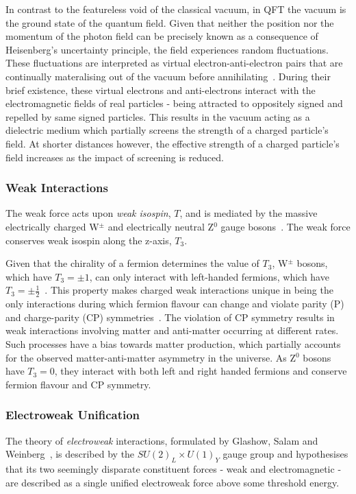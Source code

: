 In contrast to the featureless void of the classical vacuum, in QFT the vacuum is the ground state of the quantum field.
Given that neither the position nor the momentum of the photon field can be precisely known as a consequence of Heisenberg's uncertainty principle, the field experiences random fluctuations.
These fluctuations are interpreted as virtual electron-anti-electron pairs that are continually materalising out of the vacuum before annihilating~\cite{coughlan2006ideas}.
During their brief existence, these virtual electrons and anti-electrons interact with the electromagnetic fields of real particles - being attracted to oppositely signed and repelled by same signed particles.
This results in the vacuum acting as a dielectric medium which partially screens the strength of a charged particle's field.
At shorter distances however, the effective strength of a charged particle's field increases as the impact of screening is reduced.

\subsubsection{Weak Interactions}\label{subsec:weakForce}
The weak force acts upon \emph{weak isospin}, $T$, and is mediated by the massive electrically charged W$^{\pm}$ and electrically neutral Z$^{0}$ gauge bosons~\cite{ElectroweakStrong}.
The weak force conserves weak isospin along the z-axis, $T_{3}$.

Given that the chirality of a fermion determines the value of $T_{3}$, W$^{\pm}$ bosons, which have $T_{3} = \pm 1$, can only interact with left-handed fermions, which have $T_{3} = \pm \frac{1}{2}$~\cite{Cheng:1985bj}.
This property makes charged weak interactions unique in being the only interactions during which fermion flavour can change and violate parity (P)~\cite{Lee:1956qn,Wu:1957my} and charge-parity (CP) symmetries~\cite{Christenson:1964fg}.
The violation of CP symmetry results in weak interactions involving matter and anti-matter occurring at different rates.
Such processes have a bias towards matter production, which partially accounts for the observed matter-anti-matter asymmetry in the universe.
As Z$^{0}$ bosons have $T_{3} = 0$, they interact with both left and right handed fermions and conserve fermion flavour and CP symmetry.

\subsubsection{Electroweak Unification}\label{subsec:electroweak}
The theory of \emph{electroweak} interactions, formulated by Glashow, Salam and Weinberg~\cite{Glashow:1961tr,Salam:1964ry,Weinberg:1967tq}, is described by the $SU(2)_{L} \times U(1)_{Y}$ gauge group and hypothesises that its two seemingly disparate constituent forces - weak and electromagnetic - are described as a single unified electroweak force above some threshold energy.


